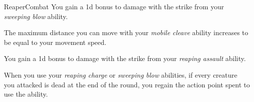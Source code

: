 \begin{feat}{Reaper}{Combat}
         You gain a \plus1d bonus to damage with the strike from your \textit{sweeping blow} ability.

         The maximum distance you can move with your \textit{mobile cleave} ability increases to be equal to your movement speed.

          You gain a \plus1d bonus to damage with the strike from your \textit{reaping assault} ability.

         When you use your \textit{reaping charge} or \textit{sweeping blow} abilities, if every creature you attacked is dead at the end of the round, you regain the action point spent to use the ability.
    \end{feat}

